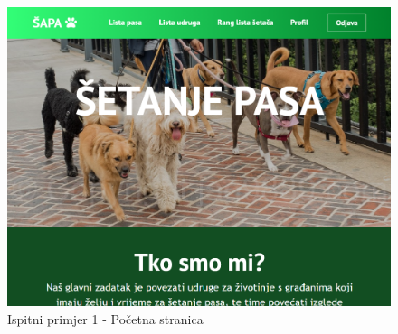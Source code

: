 				\begin{figure}[H]
					\hspace*{0in}
					\includegraphics[scale=0.5]{slike/HomePage.PNG}
					\caption{Ispitni primjer 1 - Početna stranica}
					\centering
				\end{figure}
				
